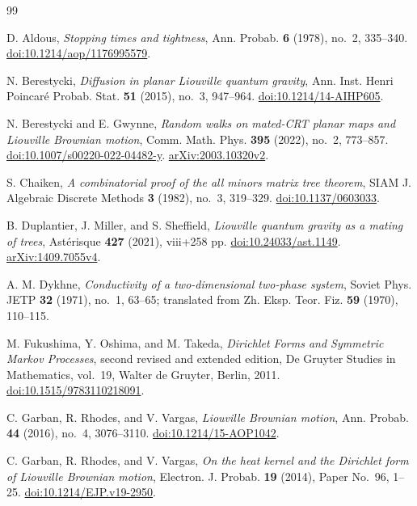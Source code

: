 \begin{thebibliography}{99}

D. Aldous,
\emph{Stopping times and tightness},
Ann. Probab. \textbf{6} (1978), no.~2, 335--340.
\href{https://doi.org/10.1214/aop/1176995579}{doi:10.1214/aop/1176995579}.

N. Berestycki,
\emph{Diffusion in planar Liouville quantum gravity},
Ann. Inst. Henri Poincar\'e Probab. Stat. \textbf{51} (2015), no.~3,
947--964.
\href{https://doi.org/10.1214/14-AIHP605}{doi:10.1214/14-AIHP605}.

N. Berestycki and E. Gwynne,
\emph{Random walks on mated-CRT planar maps and Liouville Brownian motion},
Comm. Math. Phys. \textbf{395} (2022), no.~2, 773--857.
\href{https://doi.org/10.1007/s00220-022-04482-y}{doi:10.1007/s00220-022-04482-y}.
\href{https://arxiv.org/abs/2003.10320v2}{arXiv:2003.10320v2}.

S. Chaiken,
\emph{A combinatorial proof of the all minors matrix tree theorem},
SIAM J. Algebraic Discrete Methods \textbf{3} (1982), no.~3, 319--329.
\href{https://doi.org/10.1137/0603033}{doi:10.1137/0603033}.

B. Duplantier, J. Miller, and S. Sheffield,
\emph{Liouville quantum gravity as a mating of trees},
Ast\'erisque \textbf{427} (2021), viii+258 pp.
\href{https://doi.org/10.24033/ast.1149}{doi:10.24033/ast.1149}.
\href{https://arxiv.org/abs/1409.7055v4}{arXiv:1409.7055v4}.

A. M. Dykhne,
\emph{Conductivity of a two-dimensional two-phase system},
Soviet Phys. JETP \textbf{32} (1971), no.~1, 63--65;
translated from Zh. Eksp. Teor. Fiz. \textbf{59} (1970), 110--115.

M. Fukushima, Y. Oshima, and M. Takeda,
\emph{Dirichlet Forms and Symmetric Markov Processes},
second revised and extended edition,
De Gruyter Studies in Mathematics, vol.~19,
Walter de Gruyter, Berlin, 2011.
\href{https://doi.org/10.1515/9783110218091}{doi:10.1515/9783110218091}.

C. Garban, R. Rhodes, and V. Vargas,
\emph{Liouville Brownian motion},
Ann. Probab. \textbf{44} (2016), no.~4, 3076--3110.
\href{https://doi.org/10.1214/15-AOP1042}{doi:10.1214/15-AOP1042}.

C. Garban, R. Rhodes, and V. Vargas,
\emph{On the heat kernel and the Dirichlet form of Liouville Brownian motion},
Electron. J. Probab. \textbf{19} (2014), Paper No.~96, 1--25.
\href{https://doi.org/10.1214/EJP.v19-2950}{doi:10.1214/EJP.v19-2950}.


\end{thebibliography}

